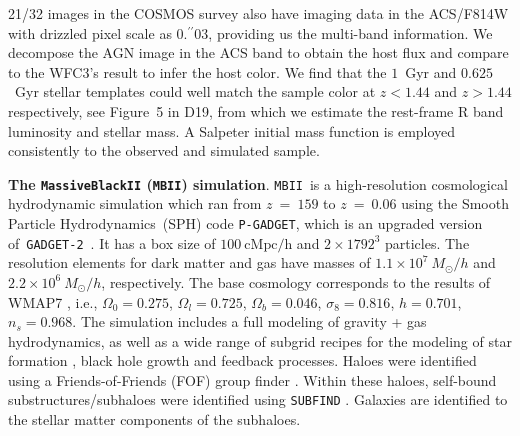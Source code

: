 \documentclass{natureprintstyle}
\newcommand{\hst}{{\it HST}}
\newcommand{\lhost}{$L_{\rm host}$}
\newcommand{\sersic}{S\'ersic}
\newcommand{\reff}{{$R_{\mathrm{eff}}$}}
\newcommand{\mstar}{{$M_*$}}
\newcommand{\farcs}{\mbox{\ensuremath{.\!\!^{\prime\prime}}}}%
\newcommand{\mbii}{\texttt{MBII}}
\begin{document}
21/32 images in the COSMOS survey also have imaging data in the ACS/F814W with drizzled pixel scale as 0\farcs03, providing us the multi-band information. We decompose the AGN image in the ACS band to obtain the host flux and compare to the WFC3's result to infer the host color. {\color{red} We find that the $1$~Gyr and $0.625$~Gyr stellar templates could well match the sample color at $z<1.44$ and $z>1.44$ respectively, see Figure~5 in D19, from which we estimate the rest-frame R band luminosity and stellar mass.} A Salpeter initial mass function is employed consistently to the observed and simulated sample.



\textbf{The \texttt{MassiveBlackII} (\mbii) simulation}.  
\mbii\ is a high-resolution cosmological hydrodynamic simulation which ran from $z~=~159$ to $z~=~0.06$ using the Smooth Particle Hydrodynamics~(SPH) code \texttt{P-GADGET}, which is an upgraded version of~\texttt{GADGET-2}~\cite{2005MNRAS.364.1105S}. It has a box size of $100~\mathrm{cMpc/h}$ and $2\times1792^3$ particles. The resolution elements for dark matter and gas have masses of $1.1\times 10^7~M_{\odot}/h$ and $2.2\times 10^6~M_{\odot}/h$, respectively. The base cosmology corresponds to the results of WMAP7 \cite{2011ApJS..192...18K}, i.e., $\Omega_0=0.275$, $\Omega_l=0.725$, $\Omega_b=0.046$, $\sigma_8=0.816$, $h = 0.701$, $n_s=0.968$.  The simulation includes a full modeling of gravity + gas hydrodynamics, as well as a wide range of subgrid recipes for the modeling of star formation \cite{2003MNRAS.339..289S}, black hole growth and feedback processes. Haloes were identified using a Friends-of-Friends (FOF) group finder \cite{1985ApJ...292..371D}. Within these haloes, self-bound substructures/subhaloes were identified using \texttt{SUBFIND} \cite{2005MNRAS.364.1105S}. Galaxies are identified to the stellar matter components of the subhaloes.
\end{document}
